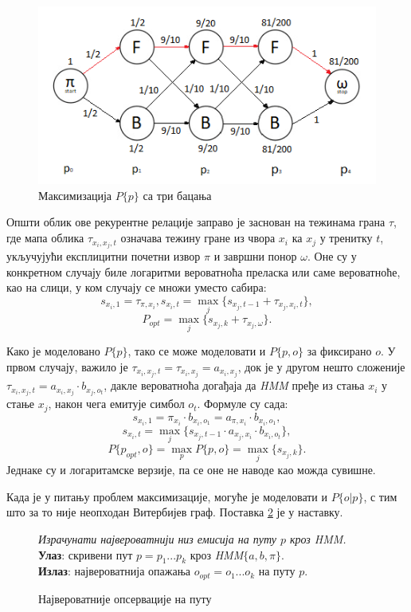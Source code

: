 \documentclass[12pt,oneside]{memoir}
\newenvironment{problem}[1][!ht]
{\renewcommand{\algorithmcfname}{Проблем}
\begin{figure}[!ht]
\centering
  \begin{minipage}{.94\linewidth}
	\begin{algorithm}[#1]%
  }{\end{algorithm}
  \end{minipage}
\end{figure}}
\begin{document}
\begin{CJK}{UTF8}{ipxm}
\begin{figure}[H]
  \centering
  \includegraphics[width=.9\textwidth]{tri_bacanja.png}
  \caption{Максимизација $P\{p\}$ са три бацања}
  \label{fig:tribac}
\end{figure}

Општи облик ове рекурентне релације заправо је заснован на тежинама грана $\tau$, где мапа облика $\tau_{x_i, x_j, t}$ означава тежину гране из чвора $x_i$ ка $x_j$ у тренитку $t$, укључујући експлицитни почетни извор $\pi$ и завршни понор $\omega$. Оне су у конкретном случају биле логаритми вероватноћа преласка или саме вероватноће, као на слици, у ком случају се множи уместо сабира: $$s_{x_i, 1} = \tau_{\pi, x_i}, s_{x_i, t} = \max_j \{s_{x_j, t-1} + \tau_{x_j, x_i, t}\},$$ $$P_{opt} = \max_j \{s_{x_j, k} + \tau_{x_j, \omega}\}.$$

Како је моделовано $P\{p\}$, тако се може моделовати и $P\{p, o\}$ за фиксирано $o$. У првом случају, важило је $\tau_{x_i, x_j, t} = \tau_{x_i, x_j} = a_{x_i, x_j}$, док је у другом нешто сложеније $\tau_{x_i, x_j, t} = a_{x_i, x_j} \cdot b_{x_j, o_t}$, дакле вероватноћа догађаја да \textit{HMM} пређе из стања $x_i$ у стање $x_j$, након чега емитује симбол $o_t$. Формуле су сада: $$s_{x_i, 1} = \pi_{x_i} \cdot b_{x_i, o_1} = a_{\pi, x_i} \cdot b_{x_i, o_1},$$ $$s_{x_i, t} = \max_j \{s_{x_j, t-1} \cdot a_{x_j, x_i} \cdot b_{x_i, o_t}\},$$ $$P\{p_{opt}, o\} = \max_p P\{p, o\} = \max_j \{s_{x_j, k}\}.$$ Једнаке су и логаритамске верзије, па се оне не наводе као можда сувишне.

Када је у питању проблем максимизације, могуће је моделовати и $P\{o | p\}$, с тим што за то није неопходан Витербијев граф. Поставка \ref{prob:maxpops} је у наставку.

\begin{problem}[H]
  \SetAlgoLined
  \textit{Израчунати највероватнији низ емисија на путу $p$ кроз \textit{HMM}.}\\
  \textbf{Улаз}: скривени пут $p = p_1...p_k$ кроз \textit{HMM}$\{a, b, \pi\}$.\\
  \textbf{Излаз}: највероватнија опажања $o_{opt} = o_1...o_k$ на путу $p$.
  \caption{Највероватније опсервације на путу}
  \label{prob:maxpops}
\end{problem}


\end{CJK}
\end{document}
